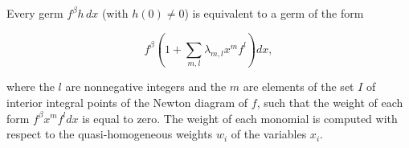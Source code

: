 Every germ $f^\beta h \, dx$ (with $h(0) \neq 0$) is equivalent to a germ of the form

$$f^\beta \left(1 + \sum_{m,l} \lambda_{m,l} x^m f^l\right) dx,$$

where the $l$ are nonnegative integers and the $m$ are elements of the set $I$ of interior integral points of the Newton diagram of $f$, such that the weight of each form $f^\beta x^m f^l dx$ is equal to zero. The weight of each monomial is computed with respect to the quasi-homogeneous weights $w_i$ of the variables $x_i$.
